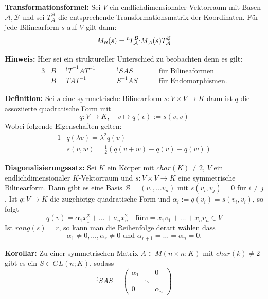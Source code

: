 \documentclass{article}
\let\oldcdot\cdot
\renewcommand{\cdot}{\raisebox{0.1ex}{$\oldcdot$}}
\begin{document}
\textbf{Transformationsformel:} Sei $V$ ein endlichdimensionaler Vektorraum mit
Basen $\mathcal{A,B}$ und sei $T^\mathcal{B}_\mathcal{A}$ die entsprechende
Transformationsmatrix der Koordinaten. Für jede Bilinearform $s$ auf $V$ gilt
dann:
\begin{equation*}
	M_\mathcal{B}(s)={^tT^\mathcal{B}_\mathcal{A}}\cdot
	M_\mathcal{A}(s)T^\mathcal{B}_\mathcal{A}
\end{equation*}

\textbf{Hinweis:} Hier sei ein struktureller Unterschied zu beobachten denn es gilt:
\begin{alignat*}{3}
	&B= {^tT}^{-1}AT^{-1} &&= {^tS}AS && \quad\text{ für Bilineaformen}\\
	&B=TAT^{-1} &&=S^{-1}AS && \quad\text{ für Endomorphismen.}
\end{alignat*}

\textbf{Definition:} Sei $s$ eine symmetrische Bilinearform $s:V\times V \to K$
dann ist $q$ die assoziierte quadratische Form mit
\begin{equation*}
	q:V\to K,\quad v\mapsto q(v) :=s(v,v)
\end{equation*}
Wobei folgende Eigenschaften gelten:
\begin{alignat*}{1}
	&q(\lambda v) = \lambda^2q(v)\\
	&s(v,w)=\frac{1}{2}(q(v+w)-q(v)-q(w))
\end{alignat*}

\newpage
\textbf{Diagonalisierungssatz:} Sei $K$ ein Körper mit $char(K)\neq 2$, $V$ ein
endlichdimensionaler $K$-Vektorraum und $s:V\times V\to K$ eine symmetrische
Bilinearform. Dann gibt es eine Basis $\mathcal{B}=(v_1,\dots v_n)$ mit
$s(v_i,v_j)=0$ für $i\neq j$. Ist $q:V\to K$ die zugehörige quadratische Form
und $\alpha_i:=q(v_i)=s(v_i,v_i)$, so folgt
\begin{equation*}
	q(v)=\alpha_1x_1^2+\dots + a_nx_n^2\quad \text{für}
	v=x_1v_1+\dots+x_nv_n\in V
\end{equation*}
Ist $rang(s)=r$, so kann man die Reihenfolge derart wählen dass
\begin{equation*}
	\alpha_1\neq 0, \dots,\alpha_r\neq 0\text{ und
	}\alpha_{r+1}=\dots=\alpha_n=0.
\end{equation*}

\textbf{Korollar:} Zu einer symmetrischen Matrix $A\in M(n\times n;K)$ mit
$char(k)\neq 2$ gibt es ein $S\in GL(n;K)$, sodass
\begin{equation*}
	{^tS}AS=\begin{pmatrix}
		\alpha_1 & & 0\\
		& \ddots & \\
		0 & & \alpha_n
	\end{pmatrix}
\end{equation*}
\end{document}

